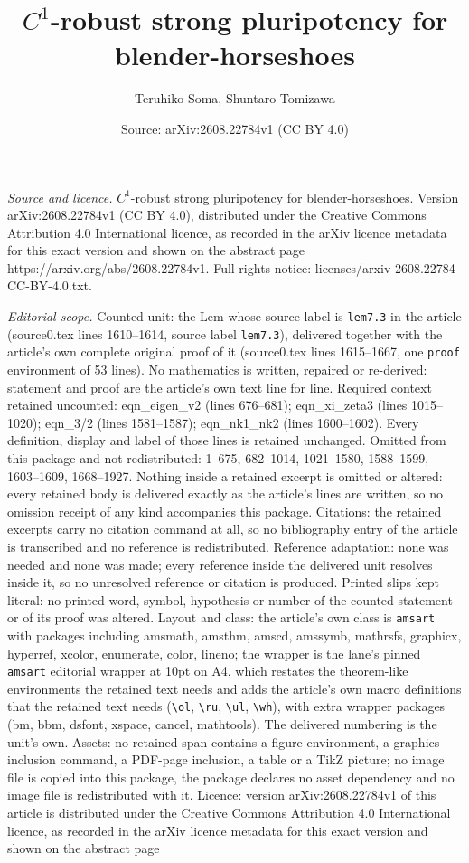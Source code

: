 \documentclass[10pt,a4paper]{amsart}
\title[$C^1$-robust strong pluripotency for blender-horseshoes]{$C^1$-robust strong pluripotency for blender-horseshoes}
\author{Teruhiko Soma, Shuntaro Tomizawa}
\date{Source: arXiv:2608.22784v1 (CC BY 4.0)}
\begin{document}
\maketitle

\noindent\emph{Source and licence.} $C^1$-robust strong pluripotency for blender-horseshoes. Version arXiv:2608.22784v1 (CC BY 4.0), distributed under the Creative Commons Attribution 4.0 International licence, as recorded in the arXiv licence metadata for this exact version and shown on the abstract page https://arxiv.org/abs/2608.22784v1. Full rights notice: licenses/arxiv-2608.22784-CC-BY-4.0.txt.\par\smallskip

\noindent\textit{Editorial scope.} Counted unit: the Lem whose source label is \texttt{lem7.3} in the article (source0.tex lines 1610--1614, source label \texttt{lem7.3}), delivered together with the article's own complete original proof of it (source0.tex lines 1615--1667, one \texttt{proof} environment of 53 lines). No mathematics is written, repaired or re-derived: statement and proof are the article's own text line for line. Required context retained uncounted: eqn\_eigen\_v2 (lines 676--681); eqn\_xi\_zeta3 (lines 1015--1020); eqn\_3/2 (lines 1581--1587); eqn\_nk1\_nk2 (lines 1600--1602). Every definition, display and label of those lines is retained unchanged. Omitted from this package and not redistributed: 1--675, 682--1014, 1021--1580, 1588--1599, 1603--1609, 1668--1927. Nothing inside a retained excerpt is omitted or altered: every retained body is delivered exactly as the article's lines are written, so no omission receipt of any kind accompanies this package. Citations: the retained excerpts carry no citation command at all, so no bibliography entry of the article is transcribed and no reference is redistributed. Reference adaptation: none was needed and none was made; every reference inside the delivered unit resolves inside it, so no unresolved reference or citation is produced. Printed slips kept literal: no printed word, symbol, hypothesis or number of the counted statement or of its proof was altered. Layout and class: the article's own class is \texttt{amsart} with packages including amsmath, amsthm, amscd, amssymb, mathrsfs, graphicx, hyperref, xcolor, enumerate, color, lineno; the wrapper is the lane's pinned \texttt{amsart} editorial wrapper at 10pt on A4, which restates the theorem-like environments the retained text needs and adds the article's own macro definitions that the retained text needs (\texttt{\textbackslash ol}, \texttt{\textbackslash ru}, \texttt{\textbackslash ul}, \texttt{\textbackslash wh}), with extra wrapper packages (bm, bbm, dsfont, xspace, cancel, mathtools). The delivered numbering is the unit's own. Assets: no retained span contains a figure environment, a graphics-inclusion command, a PDF-page inclusion, a table or a TikZ picture; no image file is copied into this package, the package declares no asset dependency and no image file is redistributed with it. Licence: version arXiv:2608.22784v1 of this article is distributed under the Creative Commons Attribution 4.0 International licence, as recorded in the arXiv licence metadata for this exact version and shown on the abstract page 
\end{document}
